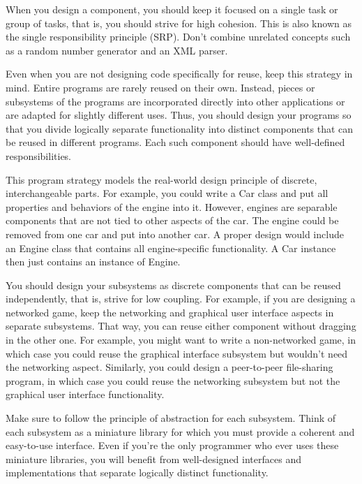 When you design a component, you should keep it focused on a single task or group of tasks, that is, you should strive for high cohesion. This is also known as the single responsibility principle (SRP). Don’t combine unrelated concepts such as a random number generator and an XML parser.

Even when you are not designing code specifically for reuse, keep this strategy in mind. Entire programs are rarely reused on their own. Instead, pieces or subsystems of the programs are incorporated directly into other applications or are adapted for slightly different uses. Thus, you should design your programs so that you divide logically separate functionality into distinct components that can be reused in different programs. Each such component should have well-defined responsibilities.

This program strategy models the real-world design principle of discrete, interchangeable parts. For example, you could write a Car class and put all properties and behaviors of the engine into it. However, engines are separable components that are not tied to other aspects of the car. The engine could be removed from one car and put into another car. A proper design would include an Engine class that contains all engine-specific functionality. A Car instance then just contains an instance of Engine.


You should design your subsystems as discrete components that can be reused independently, that is, strive for low coupling. For example, if you are designing a networked game, keep the networking and graphical user interface aspects in separate subsystems. That way, you can reuse either component without dragging in the other one. For example, you might want to write a non-networked game, in which case you could reuse the graphical interface subsystem but wouldn’t need the networking aspect. Similarly, you could design a peer-to-peer file-sharing program, in which case you could reuse the networking subsystem but not the graphical user interface functionality.

Make sure to follow the principle of abstraction for each subsystem. Think of each subsystem as a miniature library for which you must provide a coherent and easy-to-use interface. Even if you’re the only programmer who ever uses these miniature libraries, you will benefit from well-designed interfaces and implementations that separate logically distinct functionality.

